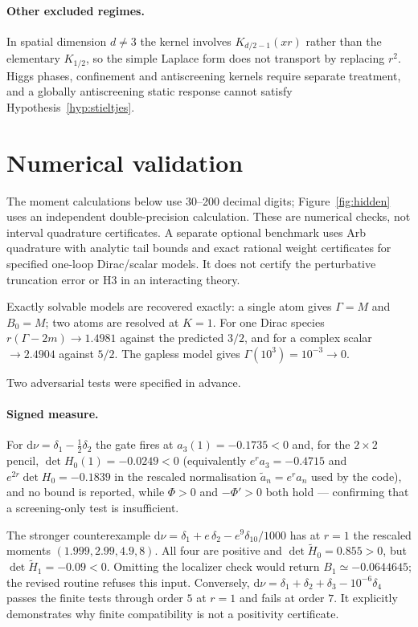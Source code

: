 \documentclass[11pt]{article}
\theoremstyle{definition}
\theoremstyle{remark}
\newcommand{\dnu}{\mathrm{d}\nu}
\begin{document}
\paragraph{Other excluded regimes.}
In spatial dimension $d\neq3$ the kernel involves $K_{d/2-1}(xr)$ rather than
the elementary $K_{1/2}$, so the simple Laplace form does not transport by
replacing $r^{2}$. Higgs phases, confinement and antiscreening kernels require
separate treatment, and a globally antiscreening static response cannot satisfy
Hypothesis~\ref{hyp:stieltjes}.

\section{Numerical validation}
\label{sec:numerics}

The moment calculations below use 30--200 decimal digits; Figure~\ref{fig:hidden}
uses an independent double-precision calculation. These are numerical checks,
not interval quadrature certificates. A separate optional benchmark uses
Arb quadrature with analytic tail bounds and exact rational weight certificates
for specified one-loop Dirac/scalar models. It does not certify the
perturbative truncation error or H3 in an interacting theory.

Exactly solvable models are recovered exactly: a single atom gives
$\Gamma=M$ and $B_{0}=M$; two atoms are resolved at $K=1$. For one Dirac
species $r(\Gamma-2m)\to1.4981$ against the predicted $3/2$, and for a complex
scalar $\to 2.4904$ against $5/2$. The gapless model gives
$\Gamma(10^{3})=10^{-3}\to0$.

Two adversarial tests were specified in advance.

\paragraph{Signed measure.}
For $\dnu=\delta_{1}-\tfrac12\delta_{2}$ the gate fires at
$a_{3}(1)=-0.1735<0$ and, for the $2\times2$ pencil, $\det H_{0}(1)=-0.0249<0$
(equivalently $e^{r}a_{3}=-0.4715$ and $e^{2r}\det H_{0}=-0.1839$ in the
rescaled normalisation $\tilde a_{n}=e^{r}a_{n}$ used by the code), and no
bound is reported, while $\Phi>0$ and $-\Phi'>0$ both hold --- confirming
that a screening-only test is insufficient.

The stronger counterexample
$\dnu=\delta_1+e\,\delta_2-e^9\delta_{10}/1000$ has at $r=1$ the rescaled
moments $(1.999,2.99,4.9,8)$. All four are positive and
$\det\widetilde H_0=0.855>0$, but
$\det\widetilde H_1=-0.09<0$. Omitting the localizer check would return
$B_1\simeq-0.0644645$; the revised routine refuses this input.
Conversely, $\dnu=\delta_1+\delta_2+\delta_3-10^{-6}\delta_4$ passes the
finite tests through order $5$ at $r=1$ and fails at order $7$. It explicitly
demonstrates why finite compatibility is not a positivity certificate.
\end{document}
